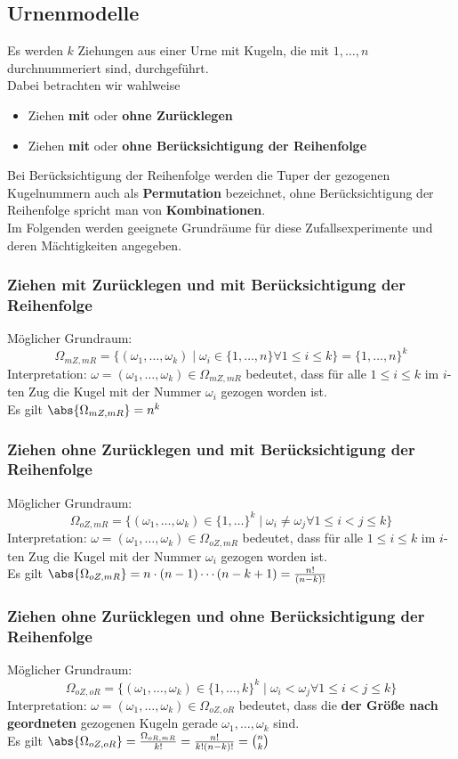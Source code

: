 \documentclass{kit}
\begin{document}
  \subsection{Urnenmodelle}
    Es werden $k$ Ziehungen aus einer Urne mit Kugeln, die mit $1,\dots,n$ durchnummeriert sind, durchgeführt.\\
    Dabei betrachten wir wahlweise
    \begin{itemize}
      \item Ziehen \textbf{mit} oder \textbf{ohne Zurücklegen}
      \item Ziehen \textbf{mit} oder \textbf{ohne Berücksichtigung der Reihenfolge}
    \end{itemize}
    Bei Berücksichtigung der Reihenfolge werden die Tuper der gezogenen Kugelnummern auch als \textbf{Permutation}
    bezeichnet, ohne Berücksichtigung der Reihenfolge spricht man von \textbf{Kombinationen}.\\
    Im Folgenden werden geeignete Grundräume für diese Zufallsexperimente und deren Mächtigkeiten angegeben.
  \subsubsection{Ziehen mit Zurücklegen und mit Berücksichtigung der Reihenfolge}
    Möglicher Grundraum:
    $$\Omega_{mZ,mR}=\{(\omega_1,\dots,\omega_k)\mid\omega_i\in\{1,\dots,n\}\forall1\le i\le k\}=\{1,\dots,n\}^k$$
    Interpretation: $\omega=(\omega_1,\dots,\omega_k)\in\Omega_{mZ,mR}$ bedeutet, dass für alle $1\le i\le k$ im $i$-ten Zug
    die Kugel mit der Nummer $\omega_i$ gezogen worden ist.\\
    Es gilt $\abs{\Omega_{mZ,mR}}=n^k$
  \subsubsection{Ziehen ohne Zurücklegen und mit Berücksichtigung der Reihenfolge}
    Möglicher Grundraum:
    $$\Omega_{oZ,mR}=\{(\omega_1,\dots,\omega_k)\in\{1,\dots\}^k\mid\omega_i\neq\omega_j\forall1\le i<j\le k\}$$
    Interpretation: $\omega=(\omega_1,\dots,\omega_k)\in\Omega_{oZ,mR}$ bedeutet, dass für alle $1\le i\le k$ im $i$-ten
    Zug die Kugel mit der Nummer $\omega_i$ gezogen worden ist.\\
    Es gilt $\abs{\Omega_{oZ,mR}}=n\cdot(n-1)\cdots(n-k+1)=\frac{n!}{(n-k)!}$
  \subsubsection{Ziehen ohne Zurücklegen und ohne Berücksichtigung der Reihenfolge}
    Möglicher Grundraum:
    $$\Omega_{oZ,oR}=\{(\omega_1,\dots,\omega_k)\in\{1,\dots,k\}^k\mid\omega_i<\omega_j\forall1\le i<j\le k\}$$
    Interpretation: $\omega=(\omega_1,\dots,\omega_k)\in\Omega_{oZ,oR}$ bedeutet, dass die \textbf{der Größe nach
    geordneten} gezogenen Kugeln gerade $\omega_1,\dots,\omega_k$ sind.\\
    Es gilt $\abs{\Omega_{oZ,oR}}=\frac{\Omega_{oR,mR}}{k!}=\frac{n!}{k!(n-k)!}=\binom{n}{k}$
\end{document}
